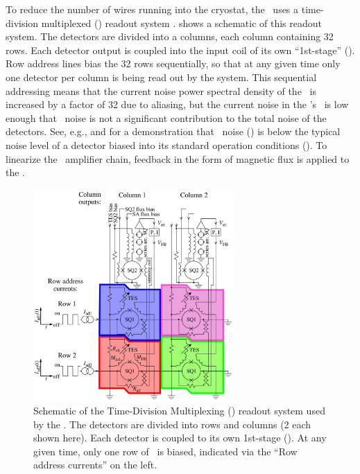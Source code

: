 To reduce the number of wires running into the cryostat, the \Imager\ uses a time-division multiplexed (\TDM) readout system \cite{chervenak_superconducting_1999,korte_time-division_2003,reintsema_prototype_2003}.
 shows a schematic of this readout system.
The detectors are divided into a columns, each column containing 32 rows.
Each detector output is coupled into the input coil of its own ``1st-stage'' \SQUID ().
Row address lines bias the 32 rows sequentially, so that at any given time only one detector per column is being read out by the system.
This sequential addressing means that the current noise power spectral density of the \SQUIDs\ is increased by a factor of 32 due to aliasing, but the current noise in the \Imager's \SQUIDs\ is low enough that \SQUID\ noise is not a significant contribution to the total noise of the detectors.
See, e.g.,  and  for a demonstration that \SQUID\ noise () is below the typical noise level of a detector biased into its standard operation conditions ().
To linearize the \SQUID\ amplifier chain, feedback in the form of magnetic flux is applied to the  \SQUIDs.

\begin{figure}
\centering
\includegraphics[width=3in]{images/ch4-tdm-schematic.png}
\caption[Time-Division Multiplexing schematic]{
  Schematic of the Time-Division Multiplexing (\TDM) readout system used by the \Imager.
  The detectors are divided into rows and columns (2 each shown here).
  Each detector is coupled to its own 1st-stage \SQUID ().
  At any given time, only one row of \SQUIDs\ is biased, indicated via the ``Row address currents'' on the left.
}
\label{fig:ch4-tdm-schematic}
\end{figure}

